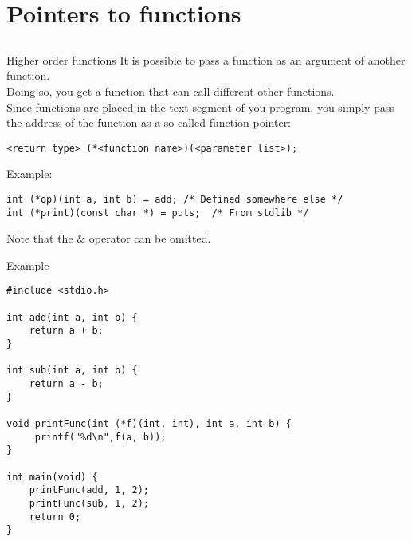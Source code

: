\section{Pointers to functions}
\subsection{}

\begin{frame}[fragile]{Higher order functions}
	It is possible to pass a function as an argument of another function.\\
	Doing so, you get a function that can call different other functions.\\
	\bigskip
	Since functions are placed in the text segment of you program, you simply pass the address of the function as a so called function pointer:\\
	\begin{lstlisting}
<return type> (*<function name>)(<parameter list>);
\end{lstlisting}
	\bigskip
	Example:
	\begin{lstlisting}
int (*op)(int a, int b) = add; /* Defined somewhere else */
int (*print)(const char *) = puts;	/* From stdlib */
\end{lstlisting}
	Note that the $\&$ operator can be omitted.
\end{frame}

\begin{frame}[fragile]{Example}
	\begin{lstlisting}
#include <stdio.h>

int add(int a, int b) {
	return a + b;
}

int sub(int a, int b) {
	return a - b;
}

void printFunc(int (*f)(int, int), int a, int b) {
	 printf("%d\n",f(a, b));
}

int main(void) {
	printFunc(add, 1, 2);
	printFunc(sub, 1, 2);
	return 0;
}
\end{lstlisting}

\end{frame}

